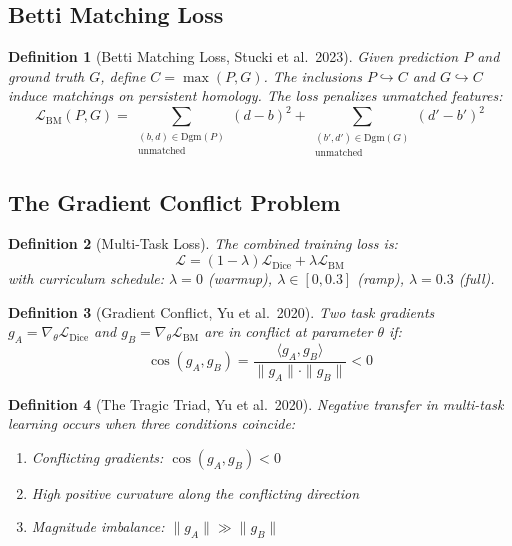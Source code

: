 \documentclass[10pt,twocolumn]{article}
\newtheorem{definition}{Definition}[section]
\begin{document}
\subsection{Betti Matching Loss}

\begin{definition}[Betti Matching Loss, Stucki et al.\ 2023]
Given prediction $P$ and ground truth $G$, define $C = \max(P, G)$. The inclusions $P \hookrightarrow C$ and $G \hookrightarrow C$ induce matchings on persistent homology. The loss penalizes unmatched features:
\begin{equation}
\mathcal{L}_{\text{BM}}(P, G) = \sum_{\substack{(b,d) \in \text{Dgm}(P) \\ \text{unmatched}}} (d-b)^2 + \sum_{\substack{(b',d') \in \text{Dgm}(G) \\ \text{unmatched}}} (d'-b')^2
\end{equation}
\end{definition}

\subsection{The Gradient Conflict Problem}

\begin{definition}[Multi-Task Loss]
The combined training loss is:
\begin{equation}
\mathcal{L} = (1 - \lambda) \mathcal{L}_{\text{Dice}} + \lambda \mathcal{L}_{\text{BM}}
\end{equation}
with curriculum schedule: $\lambda = 0$ (warmup), $\lambda \in [0, 0.3]$ (ramp), $\lambda = 0.3$ (full).
\end{definition}

\begin{definition}[Gradient Conflict, Yu et al.\ 2020]\label{def:conflict}
Two task gradients $g_A = \nabla_\theta \mathcal{L}_{\text{Dice}}$ and $g_B = \nabla_\theta \mathcal{L}_{\text{BM}}$ are in \emph{conflict} at parameter $\theta$ if:
\begin{equation}
\cos(g_A, g_B) = \frac{\langle g_A, g_B \rangle}{\|g_A\| \cdot \|g_B\|} < 0
\end{equation}
\end{definition}

\begin{definition}[The Tragic Triad, Yu et al.\ 2020]\label{def:triad}
Negative transfer in multi-task learning occurs when three conditions coincide:
\begin{enumerate}[noitemsep]
\item Conflicting gradients: $\cos(g_A, g_B) < 0$
\item High positive curvature along the conflicting direction
\item Magnitude imbalance: $\|g_A\| \gg \|g_B\|$
\end{enumerate}
\end{definition}
\end{document}
